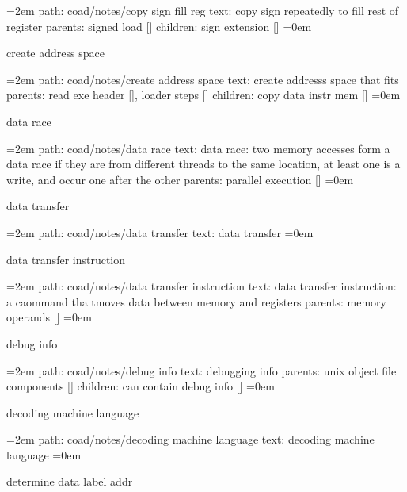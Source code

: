 \leftskip=2em
path: coad/notes/copy sign fill reg
\smallskip
text:  copy sign repeatedly to fill rest of register
\smallskip
parents:  signed load []
\smallskip
children: sign extension []
\smallskip
\leftskip=0em
\par\endgroup
\bigskip
{}
create address space
\smallskip
\par\begingroup
\leftskip=2em
path: coad/notes/create address space
\smallskip
text:  create addresss space that fits
\smallskip
parents:  read exe header [], loader steps []
\smallskip
children: copy data instr mem []
\smallskip
\leftskip=0em
\par\endgroup
\bigskip
{}
data race
\smallskip
\par\begingroup
\leftskip=2em
path: coad/notes/data race
\smallskip
text:  data race: two memory accesses form a data race if they are from different threads to the same location, at least one is a write, and occur one after the other
\smallskip
parents:  parallel execution []
\smallskip
\leftskip=0em
\par\endgroup
\bigskip
{}
data transfer
\smallskip
\par\begingroup
\leftskip=2em
path: coad/notes/data transfer
\smallskip
text:  data transfer
\smallskip
\leftskip=0em
\par\endgroup
\bigskip
{}
data transfer instruction
\smallskip
\par\begingroup
\leftskip=2em
path: coad/notes/data transfer instruction
\smallskip
text:  data transfer instruction: a caommand tha tmoves data between memory and registers
\smallskip
parents:  memory operands []
\smallskip
\leftskip=0em
\par\endgroup
\bigskip
{}
debug info
\smallskip
\par\begingroup
\leftskip=2em
path: coad/notes/debug info
\smallskip
text:  debugging info
\smallskip
parents:  unix object file components []
\smallskip
children: can contain debug info []
\smallskip
\leftskip=0em
\par\endgroup
\bigskip
{}
decoding machine language
\smallskip
\par\begingroup
\leftskip=2em
path: coad/notes/decoding machine language
\smallskip
text:  decoding machine language
\smallskip
\leftskip=0em
\par\endgroup
\bigskip
{}
determine data label addr
\smallskip
\par\begingroup
